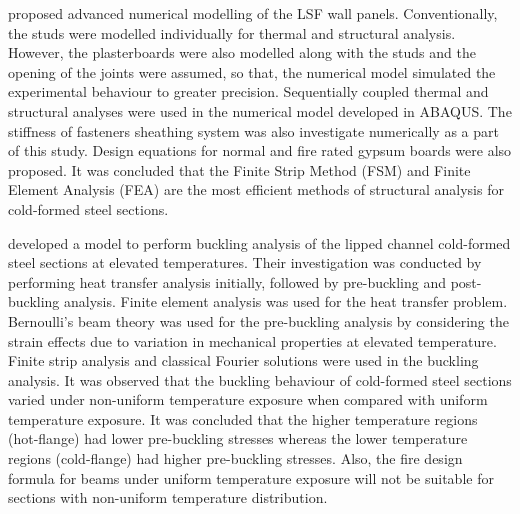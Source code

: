 \citet{BatistaAbreu2015} proposed advanced numerical modelling of the LSF wall panels. Conventionally, the studs were modelled individually for thermal and structural analysis. However, the plasterboards were also modelled along with the studs and the opening of the joints were assumed, so that, the numerical model simulated the experimental behaviour to greater precision. Sequentially coupled thermal and structural analyses were used in the numerical model developed in ABAQUS. The stiffness of fasteners sheathing system was also investigate numerically as a part of this study. Design equations for normal and fire rated gypsum boards were also proposed. It was concluded that the Finite Strip Method (FSM) and Finite Element Analysis (FEA) are the most efficient methods of structural analysis for cold-formed steel sections.  

\citet{Cheng2015} developed a model to perform buckling analysis of the lipped channel cold-formed steel sections at elevated temperatures. Their investigation was conducted by performing heat transfer analysis initially, followed by pre-buckling and post-buckling analysis. Finite element analysis was used for the heat transfer problem. Bernoulli’s beam theory was used for the pre-buckling analysis by considering the strain effects due to variation in mechanical properties at elevated temperature. Finite strip analysis and classical Fourier solutions were used in the buckling analysis. It was observed that the buckling behaviour of cold-formed steel sections varied under non-uniform temperature exposure when compared with uniform temperature exposure. It was concluded that the higher temperature regions (hot-flange) had lower pre-buckling stresses whereas the lower temperature regions (cold-flange) had higher pre-buckling stresses. Also, the fire design formula for beams under uniform temperature exposure will not be suitable for sections with non-uniform temperature distribution.

